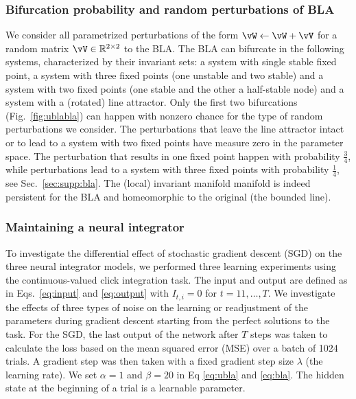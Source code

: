 \documentclass{article} %
\newcounter{ct}
\theoremstyle{definition}
\theoremstyle{remark}
\begin{document}
\subsubsection{Bifurcation probability and random perturbations of BLA}
We consider all parametrized perturbations of the form $ \vW \leftarrow \vW + \vV$ for a random matrix $\vV\in \mathbb{R}^{2\times 2}$ to the BLA.
The BLA can bifurcate in the following systems, characterized by their invariant sets: a system with single stable fixed point, a system with three fixed points (one unstable and two stable) and  a system with two fixed points (one stable and the other a half-stable node) and a system with a (rotated) line attractor. 
Only the first two bifurcations (Fig.~\ref{fig:ublabla}) can happen with nonzero chance for the type of random perturbations we consider.
The perturbations that leave the line attractor intact or to lead to a system with two fixed points have measure zero in the parameter space.
The perturbation that results in one fixed point happen with probability $\frac{3}{4}$, while perturbations lead to a system with three fixed points with probability $\frac{1}{4}$, see Sec.~\ref{sec:supp:bla}.
The (local) %
 invariant manifold manifold is indeed persistent for the BLA and homeomorphic to the original (the bounded line).



\subsubsection{Maintaining a neural integrator}\label{sec:exp:maintaining}
To investigate the differential effect of stochastic gradient descent (SGD) on the three neural integrator models, we performed three learning experiments using the continuous-valued click integration task.
The input and output are defined as in Eqs.~\ref{eq:input} and \ref{eq:output} with $I_{t,i}=0$ for $t=11,\dots,T$.
We investigate the effects of three types of noise on the learning or readjustment of the parameters during gradient descent starting from the perfect solutions to the task.
For the SGD, the last output of the network after $T$ steps was taken to calculate the loss based on the mean squared error (MSE) over a batch of 1024 trials. A gradient step was then taken with a fixed gradient step size $\lambda$ (the learning rate). We set $\alpha=1$ and $\beta=20$ in Eq \ref{eq:ubla} and \ref{eq:bla}. The hidden state at the beginning of a trial is a learnable parameter. 
\end{document}
